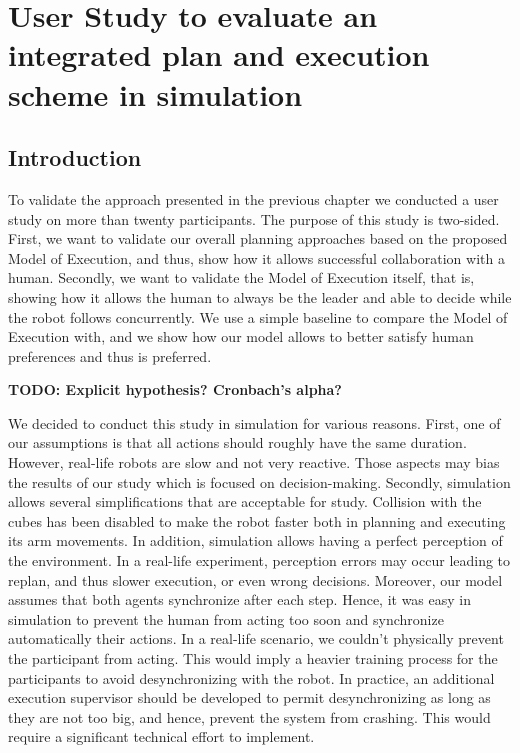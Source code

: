 \ifdefined{}
\else
\setcounter{chapter}{5} 
\dominitoc
\faketableofcontents
\fi

\chapter{User Study to evaluate an integrated plan and execution scheme in simulation}
\label{chap:6}
\minitoc

\section{Introduction}

To validate the approach presented in the previous chapter we conducted a user study on more than twenty participants. The purpose of this study is two-sided. 
First, we want to validate our overall planning approaches based on the proposed Model of Execution, and thus, show how it allows successful collaboration with a human. 
Secondly, we want to validate the Model of Execution itself, that is, showing how it allows the human to always be the leader and able to decide while the robot follows concurrently. We use a simple baseline to compare the Model of Execution with, and we show how our model allows to better satisfy human preferences and thus is preferred. 

\textbf{TODO: Explicit hypothesis? Cronbach’s alpha?}

We decided to conduct this study in simulation for various reasons. First, one of our assumptions is that all actions should roughly have the same duration. However, real-life robots are slow and not very reactive. Those aspects may bias the results of our study which is focused on decision-making. Secondly, simulation allows several simplifications that are acceptable for study. Collision with the cubes has been disabled to make the robot faster both in planning and executing its arm movements. In addition, simulation allows having a perfect perception of the environment. In a real-life experiment, perception errors may occur leading to replan, and thus slower execution, or even wrong decisions. Moreover, our model assumes that both agents synchronize after each step. Hence, it was easy in simulation to prevent the human from acting too soon and synchronize automatically their actions. In a real-life scenario, we couldn't physically prevent the participant from acting. This would imply a heavier training process for the participants to avoid desynchronizing with the robot. In practice, an additional execution supervisor should be developed to permit desynchronizing as long as they are not too big, and hence, prevent the system from crashing. This would require a significant technical effort to implement.

